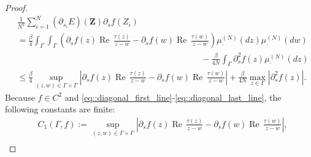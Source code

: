 \documentclass[11pt]{article}
\renewcommand{\Re}{\operatorname{Re}\,}
\renewcommand{\Im}{\operatorname{Im}\,}
\numberwithin{equation}{section}
\theoremstyle{definition}
\begin{document}
\begin{proof}
\begin{align}
    &\frac{1}{N^2}\sum_{i=1}^{N}(\partial_{s_i}E)(\boldsymbol{Z})\partial_s f(Z_i)\\
    &=\frac{\beta}{4}\int_\Gamma\int_\Gamma \left(\partial_s f(z)\Re\frac{\tau(z)}{z-w}-\partial_sf(w)\Re\frac{\tau(w)}{z-w}\right)\mu_{\cdot}^{(N)}(dz)\mu_{\cdot}^{(N)}(dw)\\
    &\hspace{9cm}- \frac{\beta}{4N}\int_{\Gamma}\partial_{s}^{2}f(z)\mu^{(N)}_{\cdot}(dz)\\
    &\le \frac{\beta}{4}\sup_{(z,w)\in \Gamma\times\Gamma}\left|\partial_s f(z)\Re\frac{\tau(z)}{z-w}-\partial_sf(w)\Re\frac{\tau(w)}{z-w}\right|
    + \frac{\beta}{4N} \max_{z\in\Gamma}|\partial_{s}^{2}f(z)|.
\end{align}
Because $f\in C^{2}$ and \eqref{eq::diagonal_first_line}-\eqref{eq::diagonal_last_line}, the following constants are finite: 
\begin{align*}
    &C_{1}(\Gamma,f):=\sup_{(z,w)\in \Gamma\times\Gamma}\left|\partial_s f(z)\Re\frac{\tau(z)}{z-w}-\partial_sf(w)\Re\frac{\tau(w)}{z-w}\right|,\\

\end{align*}
\end{proof}
\end{document}
